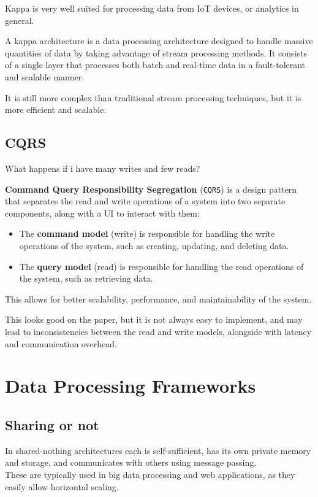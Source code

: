 Kappa is very well suited for processing data from IoT devices, or analytics in general.

A kappa architecture is a data processing architecture designed to handle massive quantities of data by taking advantage of stream processing methods. It consists of a single layer that processes both batch and real-time data in a fault-tolerant and scalable manner.

It is still more complex than traditional stream processing techniques, but it is more efficient and scalable.


\subsection{CQRS}
What happens if i have many writes and few reads?

{\textbf{Command Query Responsibility Segregation} (\texttt{CQRS}) is a design pattern that separates the read and write operations of a system into two separate components, along with a UI to interact with them:\ns
\begin{itemize}
   \item The \textbf{command model} (write) is responsible for handling the write operations of the system, such as creating, updating, and deleting data.
   \item The \textbf{query model} (read) is responsible for handling the read operations of the system, such as retrieving data.
\end{itemize}}
This allows for better scalability, performance, and maintainability of the system.


This looks good on the paper, but it is not always easy to implement, and may lead to inconsistencies between the read and write models, alongside with latency and communication overhead.

\section{Data Processing Frameworks}

\subsection{Sharing or not}

In shared-nothing architectures each is self-sufficient, has its own private memory and storage, and communicates with others using message passing.\\
These are typically used in big data processing and web applications, as they easily allow horizontal scaling.

